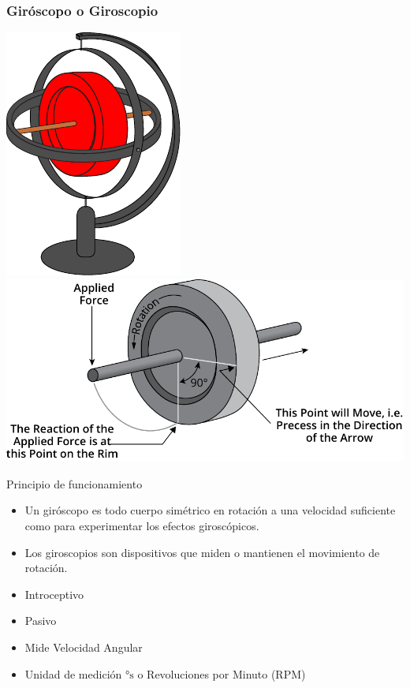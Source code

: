 \begin{frame}
    \frametitle{Giróscopo o Giroscopio}
    \scriptsize
    \begin{center}
        \includegraphics[width=0.15\columnwidth]{images/gyroscope.pdf}
        \hspace{1em}
        \includegraphics[width=0.4\columnwidth]{images/gyroscope_precession.pdf}
    \end{center}

    \begin{block}{Principio de funcionamiento}
        \begin{itemize}
            \item Un giróscopo es todo cuerpo simétrico en rotación a una velocidad suficiente como para experimentar los efectos giroscópicos.
            \item Los giroscopios son dispositivos que miden o mantienen el movimiento de rotación.
        \end{itemize}

    \end{block}

    \begin{itemize}
        \item Introceptivo
        \item Pasivo
        \item Mide Velocidad Angular
        \item Unidad de medición $\si{\degree\second}$ o Revoluciones por Minuto (RPM)
    \end{itemize}


\end{frame}

